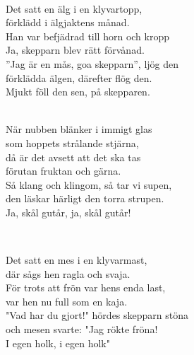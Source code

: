 
 \\       

\songtext{}Det satt en älg i en klyvartopp,\\
förklädd i älgjaktens månad.\\
Han var befjädrad till horn och kropp\\ 
Ja, skepparn blev rätt förvånad.\\
”Jag är en mås, goa skepparn”, ljög den\\ 
förklädda älgen, därefter flög den.\\ 
Mjukt föll den sen, på skepparen. \\


 \\       

\songtext{}När nubben blänker i immigt glas \\
som hoppets strålande stjärna, \\
då är det avsett att det ska tas \\
förutan fruktan och gärna. \\
Så klang och klingom, så tar vi supen, \\
den läskar härligt den torra strupen. \\
Ja, skål gutår, ja, skål gutår! \\


\newpage


 \\       

\songtext{}Det satt en mes i en klyvarmast,\\
där sågs hen ragla och svaja.\\
För trots att frön var hens enda last,\\
var hen nu full som en kaja.\\
"Vad har du gjort!" hördes skepparn stöna\\
och mesen svarte: "Jag rökte fröna!\\
I egen holk, i egen holk" \\


